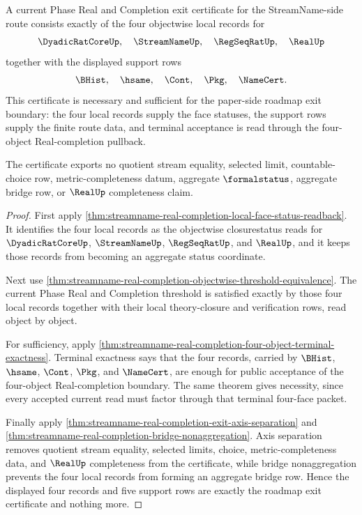 \begin{theorem}
\label{thm:streamname-real-completion-objectwise-exit-certificate}
A current Phase Real and Completion exit certificate for the StreamName-side route consists exactly of the four objectwise local records for
$$
\DyadicRatCoreUp,\quad \StreamNameUp,\quad \RegSeqRatUp,\quad \RealUp
$$
together with the displayed support rows
$$
\BHist,\quad \hsame,\quad \Cont,\quad \Pkg,\quad \NameCert.
$$
This certificate is necessary and sufficient for the paper-side roadmap exit boundary: the four local records supply the face statuses, the support rows supply the finite route data, and terminal acceptance is read through the four-object Real-completion pullback.

The certificate exports no quotient stream equality, selected limit, countable-choice row, metric-completeness datum, aggregate $\formalstatus$, aggregate bridge row, or $\RealUp$ completeness claim.
\end{theorem}
\begin{proof}
First apply \autoref{thm:streamname-real-completion-local-face-status-readback}. It identifies the four local records as the objectwise closurestatus reads for $\DyadicRatCoreUp$, $\StreamNameUp$, $\RegSeqRatUp$, and $\RealUp$, and it keeps those records from becoming an aggregate status coordinate.

Next use \autoref{thm:streamname-real-completion-objectwise-threshold-equivalence}. The current Phase Real and Completion threshold is satisfied exactly by those four local records together with their local theory-closure and verification rows, read object by object.

For sufficiency, apply \autoref{thm:streamname-real-completion-four-object-terminal-exactness}. Terminal exactness says that the four records, carried by $\BHist$, $\hsame$, $\Cont$, $\Pkg$, and $\NameCert$, are enough for public acceptance of the four-object Real-completion boundary. The same theorem gives necessity, since every accepted current read must factor through that terminal four-face packet.

Finally apply \autoref{thm:streamname-real-completion-exit-axis-separation} and \autoref{thm:streamname-real-completion-bridge-nonaggregation}. Axis separation removes quotient stream equality, selected limits, choice, metric-completeness data, and $\RealUp$ completeness from the certificate, while bridge nonaggregation prevents the four local records from forming an aggregate bridge row. Hence the displayed four records and five support rows are exactly the roadmap exit certificate and nothing more.
\end{proof}


